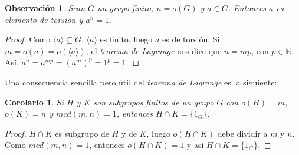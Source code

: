 \documentclass[12pt]{article}
\newtheorem{corolario}{Corolario}[theorem]
\newtheorem{observation}{Observación}[theorem]
\begin{document}
\begin{observation}Sean $G$ un grupo finito, $n = o(G)$ y $a \in G$. Entonces $a$ es elemento de torsión y $a^n = 1.$
\end{observation}
\begin{proof}
Como $\langle a \rangle \subseteq G$, $\langle a \rangle$ es finito, luego $a$ es de torsión. Si $m = o(a) = o(\langle a \rangle)$, el \textit{teorema de Lagrange} nos dice que $n = mp$, con $p \in \mathbb{N}$. Así, $a^n = a^{mp} = (a^m)^p = 1^p = 1.$

\end{proof}

Una consecuencia sencilla pero útil del \textit{teorema de Lagrange} es la siguiente:

\begin{corolario}Si $H$ y $K$ son subgrupos finitos de un grupo $G$ con $o(H) = m$, $o(K) = n$ y $mcd(m,n) = 1$, entonces $H\cap K = \lbrace 1_{G} \rbrace $.
\end{corolario}
\begin{proof}
$H\cap K$ es subgrupo de $H$ y de $K$, luego $o(H\cap K)$ debe dividir a $m$ y $n$. Como $mcd(m,n) = 1$, entonces $o(H \cap K) = 1$ y así $H \cap K = \lbrace 1_{G} \rbrace$.

\end{proof}
\end{document}
